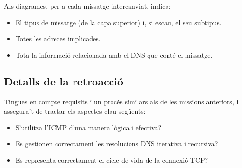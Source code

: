\begin{enumerate}[itemsep=0.1cm]
Als diagrames, per a cada missatge intercanviat, indica:
    \begin{itemize}
    \item El tipus de missatge (de la capa superior) i, si escau, el seu subtipus.
    \item Totes les adreces implicades.
    \item Tota la informació relacionada amb el DNS que conté el missatge.
    \end{itemize}

\end{enumerate}

\subsection*{Detalls de la retroacció}

Tingues en compte requisits i un procés similars als de les missions anteriors, i assegura't de tractar els aspectes clau següents:

\begin{itemize}
\item S'utilitza l'ICMP d'una manera lògica i efectiva?
\item Es gestionen correctament les resolucions DNS iterativa i recursiva?
\item Es representa correctament el cicle de vida de la connexió TCP?
\end{itemize}


